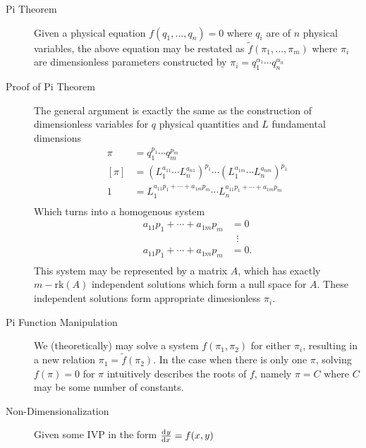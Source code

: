 \documentclass[8pt]{article}
\begin{document}

\begin{multicols}{2}
  \begin{description}
  \item[Pi Theorem] Given a physical equation $f(q_1,\ldots,q_n)=0$ where $q_i$
    are of $n$ physical variables, the above equation may be restated as
    $\tilde{f}(\pi_1,\ldots,\pi_m)$ where $\pi_i$ are dimensionless parameters
    constructed by $\pi_i=q_1^{\alpha_1}\cdots q_n^{\alpha_n}$
  \item[Proof of Pi Theorem] The general argument is exactly the same as the
    construction of dimensionless variables for $q$ physical quantities and $L$
    fundamental dimensions
    \begin{equation*}
        \begin{aligned}
          \pi &= q_1^{p_1}\cdots q_m^{p_m} \\
          [\pi] &= {(L_1^{a_{11}}\cdots L_n^{a_{n1}})}^{p_1}\cdots
          {(L_1^{a_{1m}}\cdots L_n^{a_{nm}})}^{p_1} \\
          1 &= L_1^{a_{11}p_1+\cdots+a_{1m}p_m}\cdots L_n^{a_{11}p_1+\cdots+a_{1m}p_m} \\
        \end{aligned}
    \end{equation*}
    Which turns into a homogenous system
    \begin{equation*}
      \begin{aligned}
        a_{11}p_1+\cdots+a_{1m}p_m &= 0 \\
        &\;\;\vdots \\
        a_{11}p_1+\cdots+a_{1m}p_m &= 0. \\
      \end{aligned}
    \end{equation*}
    This system may be represented by a matrix $A$, which has exactly
    $m-\text{rk}(A)$ independent solutions which form a null space for $A$.
    These independent solutions form appropriate dimesionless $\pi_i$.
  \item[Pi Function Manipulation] We (theoretically) may solve a system
    $f(\pi_1, \pi_2)$ for either $\pi_i$, resulting in a new relation
    $\pi_1=\tilde{f}(\pi_2)$. In the case when there is only one $\pi$, solving
    $f(\pi)=0$ for $\pi$ intuitively describes the roots of $f$, namely $\pi=C$
    where $C$ may be some number of constants.
  \item[Non-Dimensionalization] Given some IVP in the form $\frac{\mathrm{d}^{} {y}}{\mathrm{d}{x}^{}}=f(x,y)$

\end{description}
\end{multicols}
\end{document}
